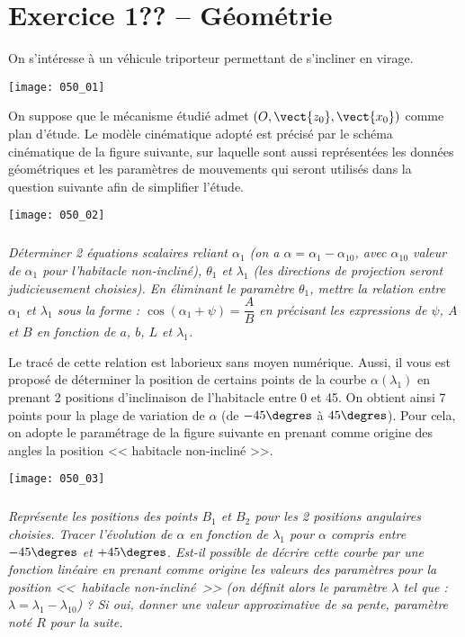 \section*{Exercice 1?? -- Géométrie}

\setcounter{exo}{0}
On s'intéresse à un véhicule triporteur permettant de s'incliner en virage.
\begin{center}
\texttt{[image: 050\_01]}
\end{center}

On suppose que le mécanisme étudié admet  $\left(O,\vect{z_0},\vect{x_0} \right)$ comme plan d'étude. Le modèle cinématique adopté est précisé par le schéma cinématique de la figure suivante, sur laquelle sont aussi représentées les données géométriques et les paramètres de mouvements qui seront utilisés dans la question suivante afin de simplifier l'étude.


\begin{center}
\texttt{[image: 050\_02]}
\end{center}
 
\subparagraph{}
\textit{Déterminer 2 équations scalaires reliant $\alpha_1$ (on a $\alpha=\alpha_1-\alpha_{10}$, avec $\alpha_{10}$ valeur de $\alpha_{1}$ pour l'habitacle non-incliné), $\theta_1$ et $\lambda_1$ (les directions de projection seront judicieusement choisies). En éliminant le paramètre $\theta_1$, mettre la relation entre $\alpha_{1}$ et $\lambda_1$ sous la forme :
$\cos\left(\alpha_1+\psi\right)=\dfrac{A}{B}$ en précisant les expressions de $\psi$, $A$ et $B$ en fonction de $a$, $b$, $L$ et $\lambda_1$.}
\ifprof
\begin{corrige}

\end{corrige}
\else
\fi


Le tracé de cette relation est laborieux sans moyen numérique. Aussi, il vous est proposé de déterminer la position de
certains points de la courbe $\alpha\left( \lambda_1 \right)$ en prenant 2 positions d'inclinaison de l'habitacle entre 0 et
45\degres. On obtient ainsi 7 points pour la plage de variation de $\alpha$ (de $- 45\degres$ à $45\degres$). Pour cela,
on adopte le paramétrage 
de la figure suivante
en prenant comme origine des angles la position 
<< habitacle non-incliné >>.

\begin{center}
\texttt{[image: 050\_03]}
\end{center}
 

\subparagraph{}
\textit{Représente les positions des points $B_1$ et $B_2$ pour les 2 positions angulaires choisies. Tracer l'évolution de $\alpha$ en fonction de $\lambda_1$ pour $\alpha$ compris entre $- 45\degres$ et $+ 45\degres$. Est-il possible de décrire cette courbe par une fonction linéaire en prenant comme origine les valeurs des paramètres pour la position <<~habitacle non-incliné~>> (on définit alors le paramètre $\lambda$ tel que : $\lambda = \lambda_1 - \lambda_{10}$) ? Si oui, donner une valeur approximative de sa pente, paramètre noté $R$ pour la suite.}
\ifprof
\begin{corrige}
\end{corrige}
\else
\fi
